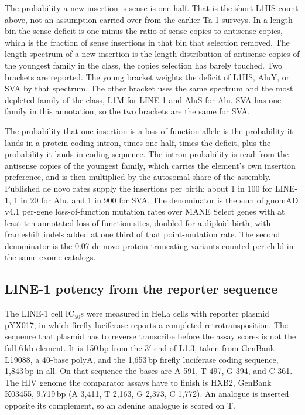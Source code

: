 \documentclass[11pt,twocolumn,twoside]{extarticle}
\begin{document}
The probability a new insertion is sense is one half. That is the short-L1HS count above, not an assumption carried over from the earlier Ta-1 surveys. In a length bin the sense deficit is one minus the ratio of sense copies to antisense copies, which is the fraction of sense insertions in that bin that selection removed. The length spectrum of a new insertion is the length distribution of antisense copies of the youngest family in the class, the copies selection has barely touched. Two brackets are reported. The young bracket weights the deficit of L1HS, AluY, or SVA by that spectrum. The other bracket uses the same spectrum and the most depleted family of the class, L1M for LINE-1 and AluS for Alu. SVA has one family in this annotation, so the two brackets are the same for SVA.

The probability that one insertion is a loss-of-function allele is the probability it lands in a protein-coding intron, times one half, times the deficit, plus the probability it lands in coding sequence. The intron probability is read from the antisense copies of the youngest family, which carries the element's own insertion preference, and is then multiplied by the autosomal share of the assembly. Published de novo rates supply the insertions per birth: about 1 in 100 for LINE-1, 1 in 20 for Alu, and 1 in 900 for SVA\cite{hancks,ewing,xing}. The denominator is the sum of gnomAD v4.1 per-gene loss-of-function mutation rates over MANE Select genes with at least ten annotated loss-of-function sites, doubled for a diploid birth\cite{chen}, with frameshift indels added at one third of that point-mutation rate\cite{kaplanis}. The second denominator is the 0.07 de novo protein-truncating variants counted per child in the same exome catalogs\cite{kaplanis}.

\subsection{LINE-1 potency from the reporter sequence}
The LINE-1 cell IC$_{50}$s were measured in HeLa cells with reporter plasmid pYX017, in which firefly luciferase reports a completed retrotransposition\cite{xie}. The sequence that plasmid has to reverse transcribe before the assay scores is not the full 6\,kb element. It is 150\,bp from the 3$'$ end of L1.3, taken from GenBank L19088, a 40-base polyA, and the 1,653\,bp firefly luciferase coding sequence, 1,843\,bp in all. On that sequence the bases are A 591, T 497, G 394, and C 361. The HIV genome the comparator assays have to finish is HXB2, GenBank K03455, 9,719\,bp (A 3,411, T 2,163, G 2,373, C 1,772). An analogue is inserted opposite its complement, so an adenine analogue is scored on T.
\end{document}
